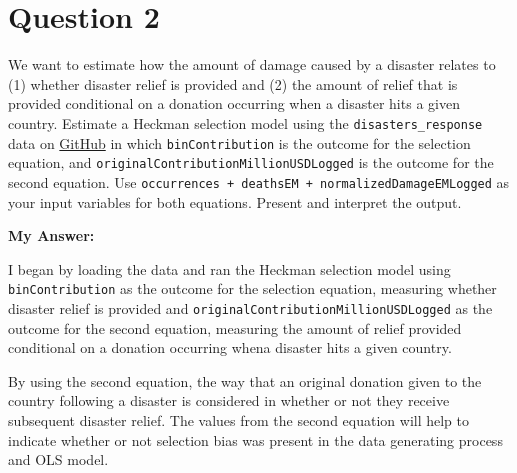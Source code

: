 \documentclass[12pt,letterpaper]{article}
\begin{document}
\section*{Question 2}
\vspace{.25cm}
\noindent We want to estimate how the amount of damage caused by a disaster relates to (1) whether disaster relief is provided and (2) the amount of relief that is provided  conditional on a donation occurring when a disaster hits a given country. Estimate a Heckman selection model using the \texttt{disasters\_response} data on \href{https://raw.githubusercontent.com/ASDS-TCD/StatsII_2026/refs/heads/main/datasets/disaster_response.csv}{GitHub} in which \texttt{binContribution} is the outcome for the selection equation, and \texttt{originalContributionMillionUSDLogged} is the outcome for the second equation. Use \texttt{occurrences  + deathsEM + normalizedDamageEMLogged} as your input variables for both equations. Present and interpret the output.

	\vspace{0.5cm}

	\noindent\textbf{My Answer:}
	
	I began by loading the data and ran the Heckman selection model using \texttt{binContribution} as the outcome for the selection equation, measuring whether disaster relief is provided and \texttt{originalContributionMillionUSDLogged} as the outcome for the second equation, measuring the amount of relief provided conditional on a donation occurring whena  disaster hits a given country.
	
	By using the second equation, the way that an original donation given to the country following a disaster is considered in whether or not they receive subsequent disaster relief. The values from the second equation will help to indicate whether or not selection bias was present in the data generating process and OLS model.

	
	
\end{document}

